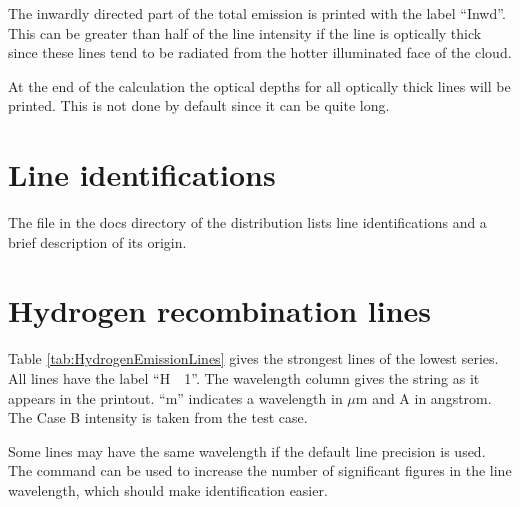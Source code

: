   The inwardly directed part of the total emission is
printed with the label ``Inwd''.  This can be greater than half of the line
intensity if the line is optically thick since these lines tend to be
radiated from the hotter illuminated face of the cloud.

  At the end of the calculation the optical
depths for all optically thick lines will be printed.
This is not done
by default since it can be quite long.

\section{Line identifications}

The file  in the docs directory of the distribution lists
line identifications and a brief description of its origin.

\section{Hydrogen recombination lines}

Table \ref{tab:HydrogenEmissionLines} gives the strongest lines
of the lowest series.
All lines have the label ``H~~1''.
The wavelength column gives
the string as it appears in the printout.  ``m'' indicates a wavelength
in $\mu$m and A in angstrom.
The Case B intensity is taken from the
 test case.

Some lines may have the same wavelength if the default line precision is used.
The  command can be used 
to increase the number of significant figures in the
line wavelength, which should make identification easier.

